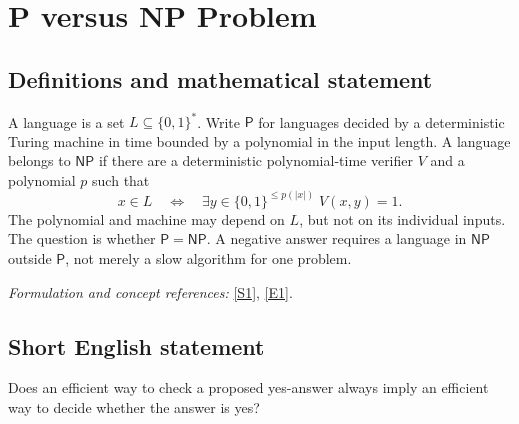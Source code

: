 \documentclass[11pt]{article}
\newcommand{\sref}[2]{\hyperlink{source:#1:#2}{[S#2]}}
\newcommand{\eref}[2]{\hyperlink{extra:#1:#2}{[E#2]}}
\newif\ifshowcatalogue
\newcommand{\cataloguescope}[1]{\ifshowcatalogue
 \paragraph{Exact scope in the supplied catalogue.}
 \begin{quote}\small #1\end{quote}\fi}
\begin{document}
\setcounter{section}{0}
\clearpage
\section*{\texorpdfstring{P versus NP Problem}{P versus NP Problem}}\label{1}
\subsection{Definitions and mathematical statement}
A language is a set $L\subseteq\{0,1\}^*$. Write $\mathsf P$ for languages decided by a deterministic Turing machine in time bounded by a polynomial in the input length. A language belongs to $\mathsf{NP}$ if there are a deterministic polynomial-time verifier $V$ and a polynomial $p$ such that
\[
 x\in L\quad\Longleftrightarrow\quad \exists y\in\{0,1\}^{\le p(|x|)}\;V(x,y)=1.
\]
The polynomial and machine may depend on $L$, but not on its individual inputs. The question is whether $\mathsf P=\mathsf{NP}$. A negative answer requires a language in $\mathsf{NP}$ outside $\mathsf P$, not merely a slow algorithm for one problem.
\par\smallskip\textit{Formulation and concept references:} \sref{1}{1}, \eref{1}{1}.
\cataloguescope{Determine whether P = NP, that is, whether every decision problem whose solutions can be verified in polynomial time by a deterministic Turing machine can also be solved in polynomial time by a deterministic Turing machine.}
\subsection{Short English statement}
Does an efficient way to check a proposed yes-answer always imply an efficient way to decide whether the answer is yes?
\end{document}
